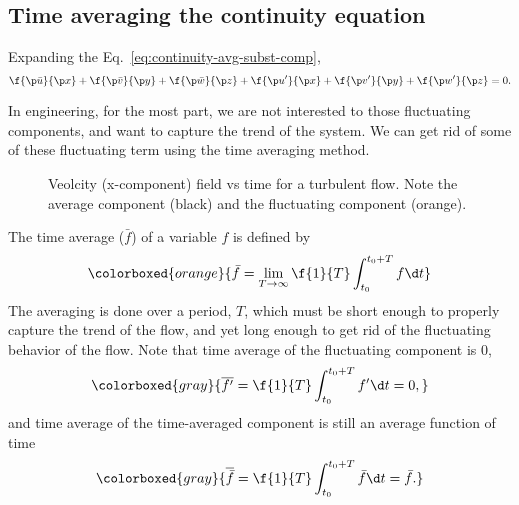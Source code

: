 \subsection{Time averaging the continuity equation}

Expanding the Eq.~\ref{eq:continuity-avg-subst-comp},
%
\begin{equation}
  \f{\p \bar{u}}{\p x}
  + \f{\p \bar{v}}{\p y}
  + \f{\p \bar{w}}{\p z}
  + \f{\p u^\prime}{\p x}
  + \f{\p v^\prime}{\p y}
  + \f{\p w^\prime}{\p z} = 0.
  \label{eq:continuity-avg-subst-comp-expanded}
\end{equation}

In engineering, for the most part, we are not interested to those fluctuating components,
and want to capture the trend of the system.
We can get rid of some of these fluctuating term using the time averaging method.

\begin{figure}[h]
  \begin{center}
  \end{center}
  \caption{Veolcity (x-component) field vs time for a turbulent flow. Note the average component (black) and the fluctuating component (orange).}\label{fig:velocity-time-avg-and-fluctuating}
\end{figure}

The time average (\(\bar{f}\)) of a variable \(f\) is defined by
%
\begin{equation}
  \colorboxed{orange}{
    \bar{f} = \lim_{T\to\infty}{\f{1}{T} \int_{t_0}^{t_0 + T}{f \d t}}
  }
  \label{eq:time-average-formula}
\end{equation}
%
The averaging is done over a period, \(T\),
which must be short enough to properly capture the trend of the flow,
and yet long enough to get rid of the fluctuating behavior of the flow.
Note that time average of the fluctuating component is \(0\),
%
\begin{equation}
  \colorboxed{gray}{
    \overline{f^\prime} = \f{1}{T} \int_{t_0}^{t_0 + T}{f^\prime \d t} = 0,
  }
  \label{eq:time-average-fluctuating-comp}
\end{equation}
%
and time average of the time-averaged component is still an average function of time
%
\begin{equation}
  \colorboxed{gray}{
    \overline{\bar{f}} = \f{1}{T} \int_{t_0}^{t_0 + T}{\bar{f} \d t} = \bar{f}.
  }
  \label{eq:time-average-average-comp}
\end{equation}

